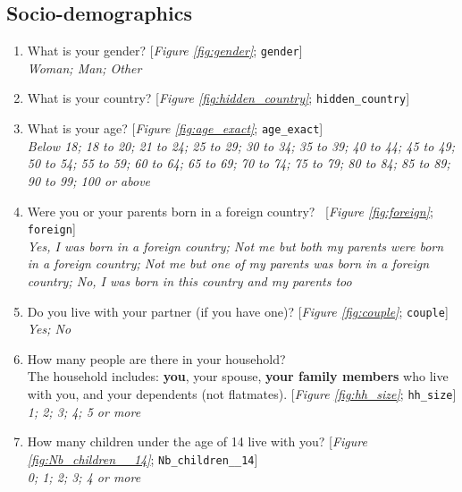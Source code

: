  \subsection*{Socio-demographics} 
 \begin{enumerate}[resume] 
\item  \label{q:gender} What is your gender? [\textit{Figure \ref{fig:gender}}; 
\verb|gender|]
  \\ \textit{Woman; Man; Other}

\item  \label{q:hidden_country} What is your country? [\textit{Figure \ref{fig:hidden_country}}; 
\verb|hidden_country|]


\item  \label{q:age_exact} What is your age? [\textit{Figure \ref{fig:age_exact}}; 
\verb|age_exact|]
  \\ \textit{Below 18; 18 to 20; 21 to 24; 25 to 29; 30 to 34; 35 to 39; 40 to 44; 45 to 49; 50 to 54; 55 to 59; 60 to 64; 65 to 69; 70 to 74; 75 to 79; 80 to 84; 85 to 89; 90 to 99; 100 or above}

\item  \label{q:foreign} Were you or your parents born in a foreign country?~ [\textit{Figure \ref{fig:foreign}}; 
\verb|foreign|]
  \\ \textit{Yes, I was born in a foreign country; Not me but both my parents were born in a foreign country; Not me but one of my parents was born in a foreign country; No, I was born in this country and my parents too}

\item  \label{q:couple} Do you live with your partner (if you have one)? [\textit{Figure \ref{fig:couple}}; 
\verb|couple|]
  \\ \textit{Yes; No}

\item  \label{q:hh_size} How many people are there in your household? \\The household includes: \textbf{you}, your spouse, \textbf{your family members} who live with you, and your dependents (not flatmates). [\textit{Figure \ref{fig:hh_size}}; 
\verb|hh_size|]
  \\ \textit{1; 2; 3; 4; 5 or more}

\item  \label{q:Nb_children__14} How many children under the age of 14 live with you? [\textit{Figure \ref{fig:Nb_children__14}}; 
\verb|Nb_children__14|]
  \\ \textit{0; 1; 2; 3; 4 or more}


\end{enumerate}
